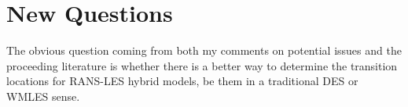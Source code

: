 \documentclass{ucb}
\begin{document}

\section{New Questions}
The obvious question coming from both my comments on potential issues and the proceeding literature is whether there is a better way to determine the transition locations for RANS-LES hybrid models, be them in a traditional DES or WMLES sense.

\ucbbib{}
    
\end{document}
